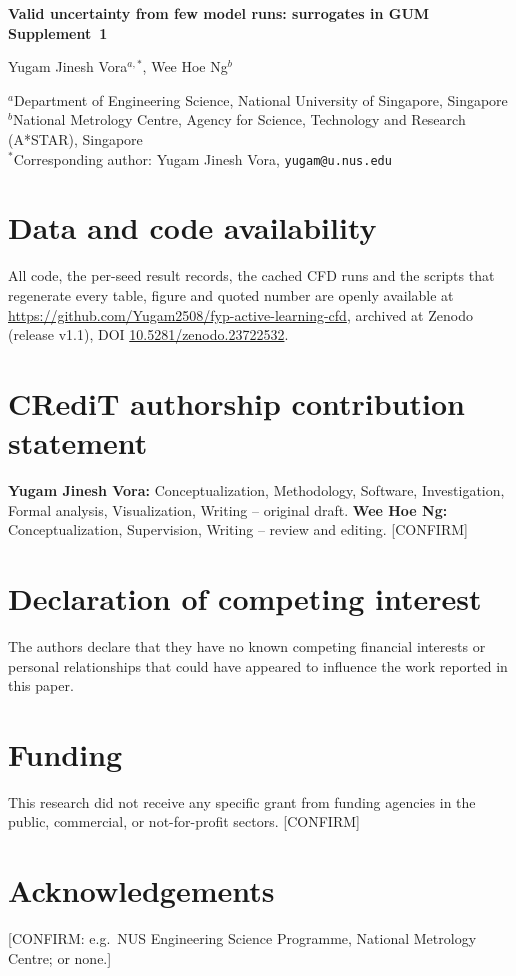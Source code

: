 \documentclass[11pt,a4paper]{article}
\begin{document}
{\Large\bfseries Valid uncertainty from few model runs: surrogates in GUM Supplement~1\par}

\bigskip
Yugam Jinesh Vora$^{a,*}$, Wee Hoe Ng$^{b}$

\smallskip
{\small
$^{a}$Department of Engineering Science, National University of Singapore,
Singapore\\
$^{b}$National Metrology Centre, Agency for Science, Technology and Research
(A*STAR), Singapore\\
$^{*}$Corresponding author: Yugam Jinesh Vora, \texttt{yugam@u.nus.edu}}

\section*{Data and code availability}
All code, the per-seed result records, the cached CFD runs and the scripts
that regenerate every table, figure and quoted number are openly available
at \url{https://github.com/Yugam2508/fyp-active-learning-cfd}, archived
at Zenodo (release v1.1), DOI \href{https://doi.org/10.5281/zenodo.23722532}{10.5281/zenodo.23722532}.

\section*{CRediT authorship contribution statement}
\textbf{Yugam Jinesh Vora:} Conceptualization, Methodology, Software,
Investigation, Formal analysis, Visualization, Writing -- original draft.
\textbf{Wee Hoe Ng:} Conceptualization, Supervision, Writing -- review and
editing. [CONFIRM]

\section*{Declaration of competing interest}
The authors declare that they have no known competing financial interests
or personal relationships that could have appeared to influence the work
reported in this paper.

\section*{Funding}
This research did not receive any specific grant from funding agencies in
the public, commercial, or not-for-profit sectors. [CONFIRM]

\section*{Acknowledgements}
[CONFIRM: e.g.\ NUS Engineering Science Programme, National Metrology
Centre; or none.]
\end{document}

